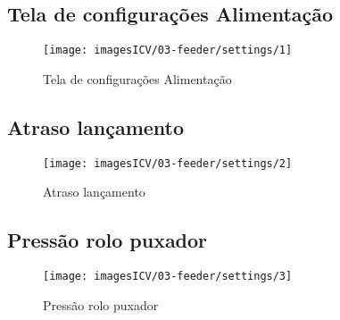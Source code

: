 \usepackage{graphicx}
\newpage
\thispagestyle{fancy}
\vspace{\fill}
\subsection{Tela de configurações Alimentação}

\begin{figure}
    \centering
    \texttt{[image: imagesICV/03-feeder/settings/1]}
    \caption{Tela de configurações Alimentação}
    \label{fig:}
\end{figure}
\newpage
\thispagestyle{fancy}
\vspace{\fill}

\subsection{Atraso lançamento}
\begin{figure}
    \centering
    \texttt{[image: imagesICV/03-feeder/settings/2]}
    \caption{Atraso lançamento}
    \label{fig:}
\end{figure}
\newpage
\thispagestyle{fancy}
\vspace{\fill}

\subsection{Pressão rolo puxador}
\begin{figure}
    \centering
    \texttt{[image: imagesICV/03-feeder/settings/3]}
    \caption{Pressão rolo puxador}
    \label{fig:}
\end{figure}
